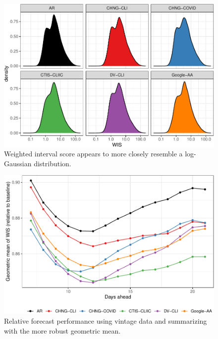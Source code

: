 \clearpage

\begin{figure}

{\centering \includegraphics[width=\textwidth]{fig/wis-densities-1} 

}

\caption{Weighted interval score appears to more closely resemble a log-Gaussian distribution.}\label{fig:wis-densities}
\end{figure}

\clearpage

\begin{figure}

{\centering \includegraphics[width=\textwidth]{fig/fcast-adjusted-1} 

}

\caption{Relative forecast performance using vintage data and summarizing with the more robust geometric mean.}\label{fig:fcast-adjusted}
\end{figure}

